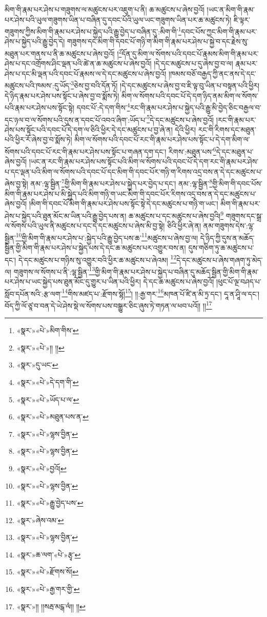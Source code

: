 མིག་གི་རྣམ་པར་ཤེས་པ་གཟུགས་ལ་མཚུངས་པར་འཇུག་པ་ནི། ཆ་མཚུངས་པ་ཞེས་བྱའོ། །ཡང་ན་མིག་གི་རྣམ་པར་ཤེས་པའི་ཡུལ་གཟུགས་ཡིན་པ་བཞིན་དུ་དབང་པོའི་ཡུལ་ཡང་གཟུགས་ཡིན་པར་ཆ་མཚུངས་ཏེ། ཇི་ལྟར་གཟུགས་ཀྱིས་མིག་གི་རྣམ་པར་ཤེས་པ་སྐྱེད་པའི་རྒྱུ་བྱེད་པ་བཞིན་དུ་:མིག་གི་\footnote{«སྣར་»«པེ་»མིག་གིས་}དབང་པོས་ཀྱང་མིག་གི་རྣམ་པར་ཤེས་པ་སྐྱེད་པའི་རྒྱུ་བྱེད་དེ། གཟུགས་དང་མིག་གི་དབང་པོ་གཉི་ག་མིག་གི་རྣམ་པར་ཤེས་པ་སྐྱེ་བ་དང་རྗེས་སུ་མཐུན་པར་གནས་པ་ནི་ཆ་མཚུངས་པ་ཞེས་བྱའོ། །\footnote{«སྣར་»«པེ་»།། །།}དོན་དུ་མིག་ལ་སོགས་པའི་དབང་པོ་རྣམས་མིག་གི་རྣམ་པར་ཤེས་པ་དང་འགྲོགས་ཤིང་ལྡན་པའི་ཚེ་ན་ཆ་མཚུངས་པ་ཞེས་བྱའོ། །དེ་དང་མཚུངས་པ་དུ་ཞེས་བྱ་བ་ལ། རྣམ་པར་ཤེས་པ་དང་མི་ལྡན་པའི་དབང་པོ་རྣམས་ལ་དེ་དང་མཚུངས་པ་ཞེས་བྱའོ། །ཁམས་བཅོ་བརྒྱད་ཀྱི་ནང་ནས་དེ་དང་མཚུངས་པའི་ཁམས་:དུ་ཡོད་\footnote{«སྣར་»དུ་ཡང་}ཅེས་བྱ་བའི་དོན་ཏོ། །དེ་དང་མཚུངས་པ་ཞེས་བྱ་བ་ཇི་ལྟ་བུ་ཡིན་པ་བསྟན་པའི་ཕྱིར། དེ་ཉིད་རྣམ་པར་ཤེས་པས་སྟོང་པ་ཞེས་བྱ་བ་སྨོས་ཏེ། མིག་ལ་སོགས་པའི་དབང་པོ་དེ་དག་ཉིད་ནམ་མིག་ལ་སོགས་པའི་རྣམ་པར་ཤེས་པས་སྟོང་སྟེ། དབང་པོ་:དེ་དག་གིས་\footnote{«སྣར་»«པེ་»དེ་དག་གི་}རང་གི་རྣམ་པར་ཤེས་པ་སྐྱེད་པའི་རྒྱུ་མི་བྱེད་ཅིང་བརྒྱལ་བ་དང་ཉལ་བ་ལ་སོགས་པའི་དུས་ན་དབང་པོ་འབའ་ཞིག་:ཡོད་པ་\footnote{«སྣར་»«པེ་»ཡོད་པ་ལ་}དེ་དང་མཚུངས་པ་ཞེས་བྱའོ། །རང་གི་རྣམ་པར་ཤེས་པས་སྟོང་པའི་དབང་པོ་དེ་དག་ལ་ཅིའི་ཕྱིར་དེ་དང་མཚུངས་པ་བྱ་ཞེ་ན། དེའི་ཕྱིར། རང་གི་རིགས་དང་མཐུན་པའི་ཕྱིར་རོ་ཞེས་བྱ་བ་སྨོས་ཏེ། མིག་ལ་སོགས་པའི་དབང་པོ་རང་གི་རྣམ་པར་ཤེས་པས་སྟོང་པ་དེ་དག་མིག་ལ་སོགས་པའི་དབང་པོ་རང་གི་རྣམ་པར་ཤེས་པས་སྟོང་པ་གཞན་དག་དང་། རིགས་:མཐུན་པས་\footnote{«སྣར་»«པེ་»མཐུན་པས་ན་}དེ་དང་མཐུན་པ་ཞེས་བྱའོ། །ཡང་ན་རང་གི་རྣམ་པར་ཤེས་པས་སྟོང་པའི་མིག་ལ་སོགས་པའི་དབང་པོ་དེ་དག་རང་གི་རྣམ་པར་ཤེས་པ་དང་ལྡན་པའི་མིག་ལ་སོགས་པའི་དབང་པོ་དང་མིག་གི་དབང་པོར་གཉི་ག་རིགས་འདྲ་བས་ན་དེ་དང་མཚུངས་པ་ཞེས་བྱ་སྟེ། ནམ་:ལྷ་སྦྱིན་\footnote{«སྣར་»«པེ་»ལྷས་བྱིན་}གྱི་མིག་གི་རྣམ་པར་ཤེས་པ་སྐྱེད་པར་བྱེད་པ་དང་། ནམ་:ལྷ་སྦྱིན་\footnote{«སྣར་»«པེ་»ལྷས་བྱིན་}གྱི་མིག་གི་དབང་པོས་མིག་གི་རྣམ་པར་ཤེས་པ་མི་སྐྱེད་པའི་མིག་གཉི་ག་ཡང་མིག་གི་དབང་པོར་རིགས་འདྲ་བས་ན་དེ་དང་མཚུངས་པ་ཞེས་བྱའོ། །མིག་གི་དབང་པོ་མིག་གི་རྣམ་པར་ཤེས་པས་སྟོང་སྟེ་དེ་དང་མཚུངས་པ་གཉི་ག་ཡང་། མིག་གི་རྣམ་པར་ཤེས་པ་སྐྱེད་པའི་ཐུན་མོང་མ་ཡིན་པའི་རྒྱུ་བྱེད་པས་ན། ཆ་མཚུངས་པ་དང་མཚུངས་པ་ཞེས་བྱའི།\footnote{«སྣར་»«པེ་»བྱའོ།} གཟུགས་དང་སྒྲ་ལ་སོགས་པའི་ཡུལ་ནི་མཚུངས་པ་དང་དེ་དང་མཚུངས་པ་ཞེས་མི་བྱ་སྟེ། ཅིའི་ཕྱིར་ཞེ་ན། ནམ་གཟུགས་དེས་:ལྷ་སྦྱིན་\footnote{«སྣར་»«པེ་»ལྷས་བྱིན་}གྱི་མིག་གི་རྣམ་པར་ཤེས་པ་:སྐྱེད་པའི་རྒྱུ་བྱེད་པས་ཆ་\footnote{«སྣར་»«པེ་»རྒྱུ་བྱེད་པས་}མཚུངས་པ་ཞེས་བྱ་ལ། དེ་ཉིད་ཀྱི་དུས་ན་མཆོད་སྦྱིན་གྱི་མིག་གི་རྣམ་པར་ཤེས་པ་སྐྱེད་པས་དེ་དང་ཆ་མཚུངས་པར་འགྱུར་བས་ན། དུས་གཅིག་ཏུ་ཆ་མཚུངས་པ་དང་། དེ་དང་མཚུངས་པ་གཉིས་སུ་འགྱུར་བའི་ཕྱིར་ཆ་མཚུངས་པ་ཞེའམ། \footnote{«སྣར་»ཞེས་འམ་}དེ་དང་མཚུངས་པ་ཞེས་གཞག་ཏུ་མེད་ལ། གཟུགས་ལ་སོགས་པ་ནི་:ལྷ་སྦྱིན་\footnote{«སྣར་»«པེ་»ལྷས་བྱིན་}གྱི་མིག་གི་རྣམ་པར་ཤེས་པ་སྐྱེད་པ་བཞིན་དུ་མཆོད་སྦྱིན་གྱི་མིག་གི་རྣམ་པར་ཤེས་པ་ཡང་སྐྱེད་པས་ཐུན་མོང་དུ་གྱུར་པ་ཡིན་པའི་ཕྱིར། དེ་དང་ཆ་མཚུངས་པ་ཞེས་བྱའོ། །ཕུང་པོ་ལྔ་བཤད་པ་སློབ་དཔོན་སའི་:རྩ་ལག་\footnote{«སྣར་»ཆ་ལག་«པེ་»རྩྭ་}གིས་མཛད་པ་:རྫོགས་སྷོ།\footnote{«སྣར་»«པེ་»རྫོགས་སོ།}། །།:རྒྱ་གར་\footnote{«སྣར་»«པེ་»རྒྱ་གར་གྱི་}མཁན་པོ་ཛི་ན་མི་ཏྲ་དང་། དཱ་ན་ཤཱི་ལ་དང་། བོད་ཀྱི་ལོ་ཙཱ་བ་བན་དེ་ཡེ་ཤེས་སྡེ་ལ་སོགས་པས་བསྒྱུར་ཅིང་ཞུས་ཏེ་གཏན་ལ་ཕབ་པའོ།། །།\footnote{«སྣར་»།། །།སརྦ་མངྒ་ལཾ།། །།}